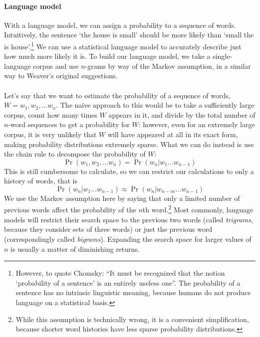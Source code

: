 \paragraph{Language model}{With a language model, we can assign a
  probability to a sequence of words. Intuitively, the sentence `the
  house is small' \cite{smt} should be more likely than `small the is
  house'.\footnote{However, to quote Chomsky: ``It must be recognized
    that the notion `probability of a sentence' is an entirely useless
    one''. The probability of a sentence has no intrinsic linguistic
    meaning, because humans do not produce language on a statistical
    basis.} We can use a statistical language model to accurately
  describe just how much more likely it is. To build our language
  model, we take a single-language corpus and use $n$-grams by way of
  the Markov assumption\cite{markov}, in a similar way to Weaver's
  original suggestions.}
\paragraph{}{Let's say that we want to estimate the probability of a
   sequence of words, $W = w_1, w_2, \dots w_n$. The na{\"i}ve
   approach to this would be to take a sufficiently large corpus,
   count how many times $W$ appears in it, and divide by the total
   number of $n$-word sequences to get a probability for $W$: however,
   even for an extremely large corpus, it is very unlikely that $W$
   will have appeared at all in its exact form, making probability
   distributions extremely sparse. What we can do instead is use the
   chain rule to decompose the probability of $W$\cite{smt}:
   $$ \Pr(w_1, w_2, \dots w_n) = \Pr(w_n | w_1 \dots w_{n-1})$$ This
   is still cumbersome to calculate, so we can restrict our
   calculations to only a history of words, that is
   $$ \Pr(w_n | w_1 \dots w_{n-1}) \approx \Pr(w_n|w_{n-m} \dots
   w_{n-1})$$ We use the Markov assumption here by saying that only a
   limited number of previous words affect the probability of the
   $n$th word.\footnote{While this assumption is technically wrong,
     it is a convenient simplification, because shorter word histories
     have less sparse probability distributions.} Most commonly,
   language models will restrict their search space to the previous
   two words (called {\it trigrams}, because they consider sets of
   three words) or just the previous word (correspondingly called {\it
     bigrams}). Expanding the search space for larger values of $n$ is
   usually a matter of diminishing returns. }
